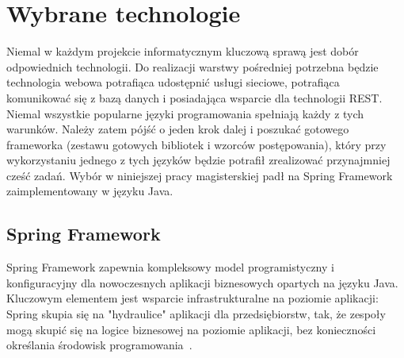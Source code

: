 
\section{Wybrane technologie}
\label{sec:technologies}

Niemal w każdym projekcie informatycznym kluczową sprawą jest dobór odpowiednich technologii. Do realizacji warstwy pośredniej potrzebna będzie technologia webowa potrafiąca udostępnić usługi sieciowe, potrafiąca komunikować się z bazą danych i posiadająca wsparcie dla technologii REST. Niemal wszystkie popularne języki programowania spełniają każdy z tych warunków. Należy zatem pójść o jeden krok dalej i poszukać gotowego frameworka (zestawu gotowych bibliotek i wzorców postępowania), który przy wykorzystaniu jednego z tych języków będzie potrafił zrealizować przynajmniej cześć zadań. Wybór w niniejszej pracy magisterskiej padł na Spring Framework zaimplementowany w języku Java. 

\subsection{Spring Framework  }
Spring Framework zapewnia kompleksowy model programistyczny i konfiguracyjny dla nowoczesnych aplikacji biznesowych opartych na języku Java. Kluczowym elementem jest wsparcie infrastrukturalne  na poziomie aplikacji: Spring skupia się na "hydraulice" aplikacji dla przedsiębiorstw, tak, że zespoły mogą skupić się na logice biznesowej na poziomie aplikacji, bez konieczności określania środowisk programowania~\cite{springFramework}.


